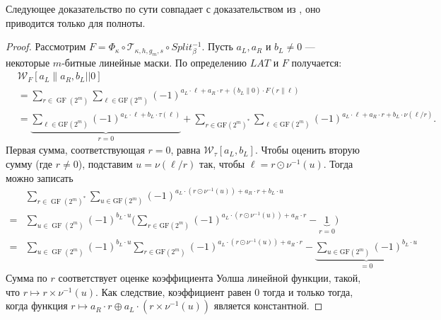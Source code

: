 
Следующее доказательство по сути совпадает с доказательством из \cite{BPU16b}, оно приводится только для полноты.

\begin{proof}
Рассмотрим $F=\Phi_{\kappa} \circ \mathscr{T}_{\kappa, h, g_{m}, s} \circ Split_{\beta}^{-1}$. Пусть $a_{L}, a_{R}$ и $b_{L} \neq 0$ — некоторые $m$-битные линейные маски. По определению $LAT$ и $F$ получается:
$$
\begin{aligned}
& \mathcal{W}_{F}\left[a_{L} \| a_{R}, b_{L}| | 0\right] \\
& =\sum_{r \in \operatorname{GF}\left(2^{m}\right)} \sum_{\ell \in \mathrm{GF}\left(2^{m}\right)}(-1)^{a_{L} \cdot \ell+a_{R} \cdot r+\left(b_{L} \| 0\right) \cdot F(r \| \ell)} \\
& =\underbrace{\sum_{\ell \in \mathrm{GF}\left(2^{m}\right)}(-1)^{a_{L} \cdot \ell+b_{L} \cdot \tau(\ell)}}_{r=0}+\sum_{r \in \mathrm{GF}\left(2^{m}\right)^*} \sum_{\ell \in \mathrm{GF}\left(2^{m}\right)}(-1)^{a_{L} \cdot \ell+a_{R} \cdot r+b_{L} \cdot \nu(\ell / r)} .
\end{aligned}
$$
Первая сумма, соответствующая $r=0$, равна $\mathcal{W}_{\tau}\left[a_{L}, b_{L}\right]$. Чтобы оценить вторую сумму (где $r \neq 0$), подставим $u=\nu(\ell / r)$ так, чтобы $\ell=r \odot \nu^{-1}(u)$. Тогда можно записать
$$
\begin{aligned}
& \sum_{r \in \operatorname{GF}\left(2^{m}\right)^{*}} \sum_{u \in \mathrm{GF}\left(2^{m}\right)}(-1)^{a_{L} \cdot\left(r \odot \nu^{-1}(u)\right)+a_{R} \cdot r+b_{L} \cdot u} \\
= & \sum_{u \in \operatorname{GF}\left(2^{m}\right)}(-1)^{b_{L} \cdot u}\bigg(\sum_{r \in \mathrm{GF}\left(2^{m}\right)}(-1)^{a_{L} \cdot\left(r \odot \nu^{-1}(u)\right)+a_{R} \cdot r}-\underbrace{1}_{r=0}\bigg) \\
= & \sum_{u \in \operatorname{GF}\left(2^{m}\right)}(-1)^{b_{L} \cdot u} \sum_{r \in \mathrm{GF}\left(2^{m}\right)}(-1)^{a_{L} \cdot\left(r \odot \nu^{-1}(u)\right)+a_{R} \cdot r}-\underbrace{\sum_{u \in \mathrm{GF}\left(2^{m}\right)}(-1)^{b_{L} \cdot u}}_{=0}
\end{aligned}
$$
Сумма по $r$ соответствует оценке коэффициента Уолша линейной функции, такой, что $r \mapsto r \times \nu^{-1}(u)$. Как следствие, коэффициент равен 0 тогда и только тогда, когда функция $r \mapsto a_{R} \cdot r \oplus a_{L} \cdot\left(r \times \nu^{-1}(u)\right)$ является константной.


\end{proof}
